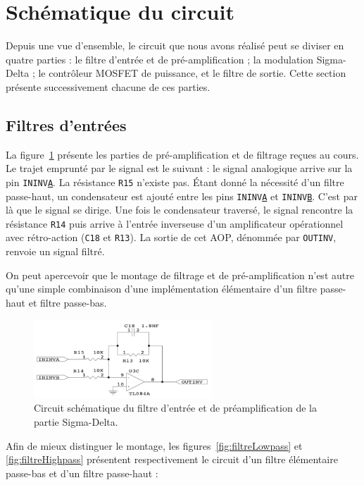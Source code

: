 \documentclass[10pt, oneside, a4paper]{article}
\begin{document}
\section{Schématique du circuit}
Depuis une vue d'ensemble, le circuit que nous avons réalisé peut se diviser en quatre parties : le filtre d'entrée et de pré-amplification ; la modulation Sigma-Delta ; le contrôleur MOSFET de puissance, et le filtre de sortie.
Cette section présente successivement chacune de ces parties.

\subsection{Filtres d'entrées}
La figure~\ref{fig:schemaPreAmpli} présente les parties de pré-amplification et de filtrage reçues au cours.
Le trajet emprunté par le signal est le suivant : le signal analogique arrive sur la pin \texttt{ININV\underline{A}}.
La résistance \texttt{R15} n'existe pas.
Étant donné la nécessité d'un filtre passe-haut, un condensateur est ajouté entre les pins \texttt{ININV\underline{A}} et \texttt{ININV\underline{B}}.
C'est par là que le signal se dirige.
Une fois le condensateur traversé, le signal rencontre la résistance \texttt{R14} puis arrive à l'entrée inverseuse d'un amplificateur opérationnel avec rétro-action (\texttt{C18} et \texttt{R13}).
La sortie de cet AOP, dénommée par \texttt{OUTINV}, renvoie un signal filtré.

On peut apercevoir que le montage de filtrage et de pré-amplification n'est autre qu'une simple combinaison d'une implémentation élémentaire d'un filtre passe-haut et filtre passe-bas.
\begin{figure}[!ht]
    \centering
    \includegraphics[width=0.6\textwidth]{image/schematique-all.jpg}
    \caption{Circuit schématique du filtre d'entrée et de préamplification de la partie
             Sigma-Delta.}
    \label{fig:schemaPreAmpli}
\end{figure}

Afin de mieux distinguer le montage, les figures~\ref{fig:filtreLowpass} et \ref{fig:filtreHighpass} présentent respectivement le circuit d'un filtre élémentaire passe-bas et d'un filtre passe-haut :
\end{document}
